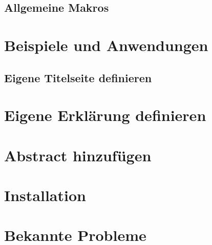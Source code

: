 \documentclass[babel=ngerman,highlight=false]{skdoc}
\begin{document}
            \WithValues{}\bigskip
            
            \WithValues{}\bigskip
            
            \WithValues{}\bigskip
            
            \WithValues{}\bigskip
            
        \subsection{Allgemeine Makros}
            \DescribeMacro{}
            
            \DescribeMacro{}
            
            \DescribeMacro\dhbwdeclaration
            
            \DescribeMacro\getAuthor
            
            \DescribeMacro\getDate
            
            \DescribeMacro\getThesisTitle
            
            \DescribeMacro\getThesisSecondTitle
            
            \DescribeMacro\getLocation
            
            \DescribeMacro\getSupervisor
            
            \DescribeMacro\getCourse
            
            \DescribeMacro\getStudentId
            
            \DescribeMacro\getInstitute
            
            \DescribeMacro\getInstituteSection
            
            \DescribeMacro\getProcessingPeriod
            
    \section{Beispiele und Anwendungen}
        \subsection{Eigene Titelseite definieren}
            \blindtext
            
        \section{Eigene Erklärung definieren}
            \blindtext
            
        \section{Abstract hinzufügen}
            \blindtext
            
    \section{Installation}
        \blindtext

    \section{Bekannte Probleme}
        \blindtext

    \PrintChanges
    \PrintIndex
\end{document}
